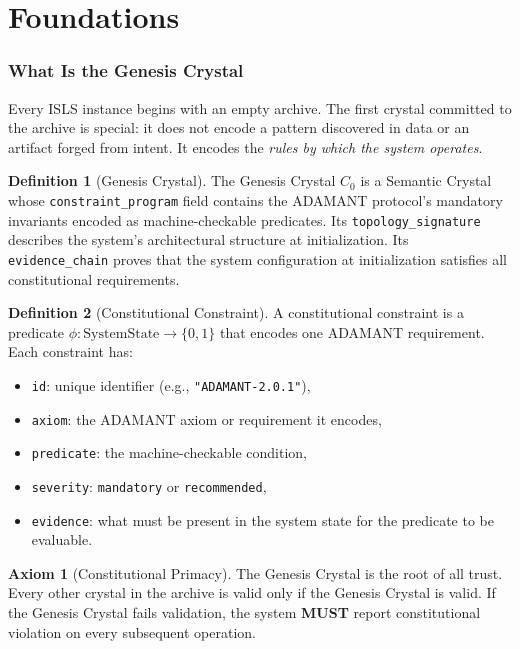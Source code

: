 \documentclass[11pt,a4paper,twoside]{article}
\theoremstyle{definition}
\newtheorem{definition}{Definition}[section]
\newtheorem{axiom}{Axiom}[section]
\theoremstyle{plain}
\theoremstyle{remark}
\newcommand{\ISLS}{\textsf{ISLS}}
\newcommand{\ADAMANT}{\textsf{ADAMANT}}
\begin{document}
\tableofcontents
\newpage


\part{Foundations}\label{part:foundations}

\section{What Is the Genesis Crystal}\label{sec:what}

Every \ISLS{} instance begins with an empty archive. The first crystal
committed to the archive is special: it does not encode a pattern
discovered in data or an artifact forged from intent. It encodes the
\emph{rules by which the system operates}.

\begin{definition}[Genesis Crystal]\label{def:genesis}
The Genesis Crystal $C_0$ is a Semantic Crystal whose
\texttt{constraint\_program} field contains the \ADAMANT{} protocol's
mandatory invariants encoded as machine-checkable predicates. Its
\texttt{topology\_signature} describes the system's architectural
structure at initialization. Its \texttt{evidence\_chain} proves that
the system configuration at initialization satisfies all constitutional
requirements.
\end{definition}

\begin{definition}[Constitutional Constraint]\label{def:constraint}
A constitutional constraint is a predicate $\phi: \mathrm{SystemState}
\to \{0, 1\}$ that encodes one \ADAMANT{} requirement. Each constraint
has:
\begin{itemize}[nosep]
  \item \texttt{id}: unique identifier (e.g., \texttt{"ADAMANT-2.0.1"}),
  \item \texttt{axiom}: the \ADAMANT{} axiom or requirement it encodes,
  \item \texttt{predicate}: the machine-checkable condition,
  \item \texttt{severity}: \texttt{mandatory} or \texttt{recommended},
  \item \texttt{evidence}: what must be present in the system state for
        the predicate to be evaluable.
\end{itemize}
\end{definition}

\begin{axiom}[Constitutional Primacy]\label{ax:primacy}
The Genesis Crystal is the root of all trust. Every other crystal in
the archive is valid only if the Genesis Crystal is valid. If the
Genesis Crystal fails validation, the system \textbf{MUST} report
constitutional violation on every subsequent operation.
\end{axiom}
\end{document}
